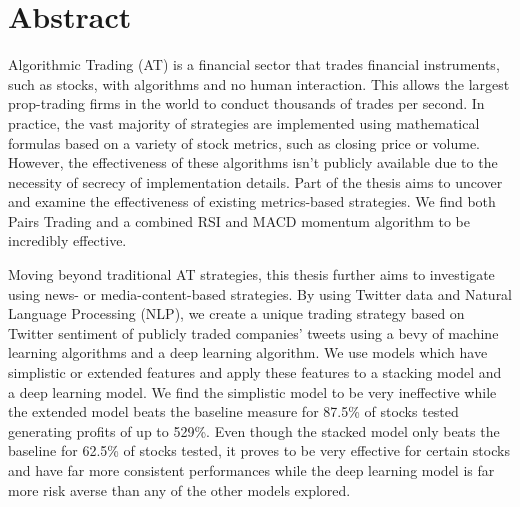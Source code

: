 \documentclass[../thesis.tex]{subfiles}
\begin{document}
\chapter*{Abstract}

Algorithmic Trading (AT) is a financial sector that trades financial instruments, such as stocks, with algorithms and no human interaction. This allows the largest prop-trading firms in the world to conduct thousands of trades per second. In practice, the vast majority of strategies are implemented using mathematical formulas based on a variety of stock metrics, such as closing price or volume. However, the effectiveness of these algorithms isn't publicly available due to the necessity of secrecy of implementation details. Part of the thesis aims to uncover and examine the effectiveness of existing metrics-based strategies. We find both Pairs Trading and a combined RSI and MACD momentum algorithm to be incredibly effective.

Moving beyond traditional AT strategies, this thesis further aims to investigate using news- or media-content-based strategies. By using Twitter data and Natural Language Processing (NLP), we create a unique trading strategy based on Twitter sentiment of publicly traded companies' tweets using a bevy of machine learning algorithms and a deep learning algorithm. We use models which have simplistic or extended features and apply these features to a stacking model and a deep learning model. We find the simplistic model to be very ineffective while the extended model beats the baseline measure for 87.5\% of stocks tested generating profits of up to 529\%. Even though the stacked model only beats the baseline for 62.5\% of stocks tested, it proves to be very effective for certain stocks and have far more consistent performances while the deep learning model is far more risk averse than any of the other models explored.
\end{document}
